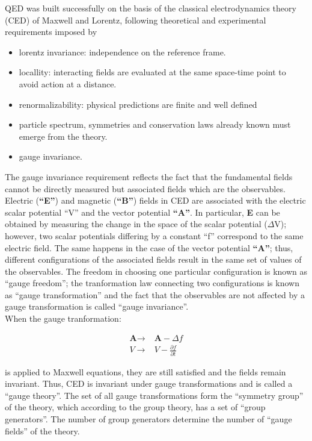 \noindent QED was built successfully on the basis of the classical electrodynamics theory (CED) of Maxwell and Lorentz, following theoretical and experimental requirements imposed by

\begin{itemize}
\item lorentz invariance: independence on the reference frame.  
\item locallity: interacting fields are evaluated at the same space-time point to avoid action at a distance. 
\item renormalizability: physical predictions are finite and well defined 
\item particle spectrum, symmetries and conservation laws already known must emerge from the theory.
\item gauge invariance.
\end{itemize}

\noindent The gauge invariance requirement reflects the fact that the fundamental fields cannot be directly measured but associated fields which are the observables. Electric (\textbf{``E''}) and magnetic (\textbf{``B''}) fields in CED are associated with the electric scalar potential ``V'' and the vector potential \textbf{``A''}. In particular, \textbf{E} can be obtained by measuring the change in the space of the scalar potential (\textbf{$\Delta$}V); however, two scalar potentials differing by a constant ``f'' correspond to the same electric field. The same happens in the case of the vector potential \textbf{``A''}; thus, different configurations of the associated fields result in the same set of values of the observables. The freedom in choosing one particular configuration is known as ``gauge freedom''; the tranformation law connecting two configurations is known as ``gauge transformation'' and the fact that the observables are not affected by a gauge transformation is called ``gauge invariance''.\\

\noindent When the gauge tranformation:  

\begin{align}\label{cov_der}
\textbf{A} \to &\textbf{A} -\Delta f\nonumber\\
V \to & V - \frac{\partial f}{\partial t}
\end{align}

\noindent is applied to Maxwell equations, they are still satisfied and the fields remain invariant. Thus, CED is invariant under gauge transformations and is called a ``gauge theory''. The set of all gauge transformations form the ``symmetry group'' of the theory, which according to the group theory, has a set of ``group generators''. The number of group generators determine the number of ``gauge fields'' of the theory.\\

